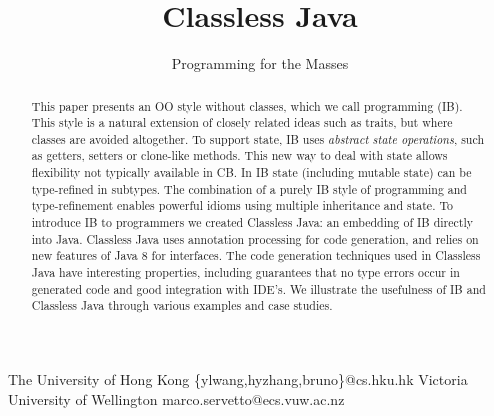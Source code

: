 \documentclass[10pt,preprint,nocopyrightspace,numbers]{sigplanconf}
\begin{document}
\setlength{\pdfpageheight}{\paperheight}
\setlength{\pdfpagewidth}{\paperwidth}




\title{Classless Java}
\subtitle{\InterfaceBased Programming for the Masses}

           {The University of Hong Kong}
           {\{ylwang,hyzhang,bruno\}@cs.hku.hk}
          {Victoria University of Wellington}
          {marco.servetto@ecs.vuw.ac.nz}

\maketitle

\begin{abstract}
  This paper presents an OO style without classes, which we call \interfacebased \objectoriented
  programming (IB). This style is a natural extension of closely
  related ideas such as traits, but where classes are avoided altogether.
  To support state, IB uses \emph{abstract state
    operations}, such as getters, setters or clone-like methods. This
  new way to deal with state allows flexibility not typically
  available in CB.  In IB state (including mutable state)
  can be type-refined in subtypes. The combination of a
  purely IB style of programming and type-refinement enables
  powerful idioms using multiple inheritance and state. To introduce
  IB to programmers we created Classless Java: an embedding of IB
  directly into Java. Classless Java uses annotation processing for
  code generation, and relies on new features of Java 8 for
  interfaces. The code generation techniques used in Classless Java
  have interesting properties, including guarantees that no type
  errors occur in generated code and good integration with IDE's. 
  We illustrate the usefulness of IB and Classless Java through various
  examples and case studies.
\end{abstract}
\end{document}
